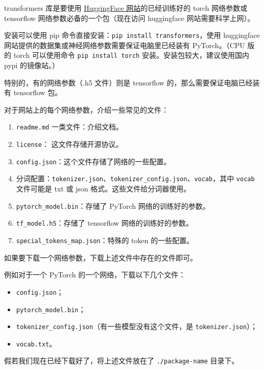 
\begin{issues}
\issueDraft
\end{issues}

transformers 库是要使用 \href{https://huggingface.co}{HuggingFace 网站}的已经训练好的 torch 网络参数或 tensorflow 网络参数必备的一个包（现在访问 huggingface 网站需要科学上网）。

安装可以使用 pip 命令直接安装：\verb`pip install transformers`，使用 huggingface 网站提供的数据集或神经网络参数需要保证电脑里已经装有 PyTorch。（CPU 版的 torch 可以使用命令 \verb`pip install torch` 安装。安装包较大，建议使用国内 pypi 的镜像站。）

特别的，有的网络参数（.h5 文件）则是 tensorflow 的，那么需要保证电脑已经装有 tensorflow 包。

对于网站上的每个网络参数，介绍一些常见的文件：
\begin{enumerate}
\item \verb`readme.md` 一类文件：介绍文档。
\item \verb`license`： 这文件存储开源协议。
\item \verb`config.json`：这个文件存储了网络的一些配置。
\item 分词配置：\verb`tokenizer.json`、\verb`tokenizer_config.json`、\verb`vocab`，其中 \verb`vocab` 文件可能是 txt 或 json 格式。这些文件给分词器使用。
\item \verb`pytorch_model.bin`：存储了 PyTorch 网络的训练好的参数。
\item \verb`tf_model.h5`：存储了 tensorflow 网络的训练好的参数。
\item \verb`special_tokens_map.json`：特殊的 token 的一些配置。
\end{enumerate}

如果要下载一个网络参数，下载上述文件中存在的文件即可。

例如对于一个 PyTorch 的一个网络，下载以下几个文件：
\begin{itemize}
\item \verb`config.json`；
\item \verb`pytorch_model.bin`；
\item \verb`tokenizer_config.json`（有一些模型没有这个文件，是 \verb`tokenizer.json`）；
\item \verb`vocab.txt`。
\end{itemize}

假若我们现在已经下载好了，将上述文件放在了 \verb`./package-name` 目录下。


